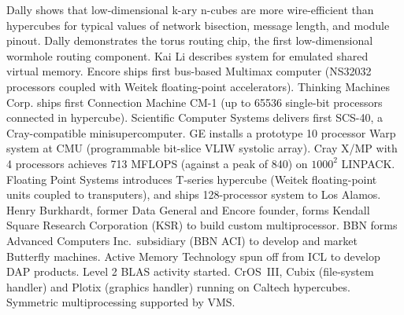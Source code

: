 	{Dally shows that low-dimensional k-ary n-cubes are more
	wire-efficient than hypercubes for typical values of network 
	bisection, message length, and module pinout.
	Dally demonstrates the torus routing chip, the first
	low-dimensional wormhole routing component.}
	{Kai Li describes system for emulated shared virtual memory.}
	{Encore ships first bus-based Multimax computer
	(NS32032 processors coupled with Weitek floating-point accelerators).}
	{Thinking Machines Corp. ships first Connection Machine CM-1
	(up to 65536 single-bit processors connected in hypercube).}
	{Scientific Computer Systems delivers first SCS-40,
	a Cray-compatible minisupercomputer.}
	{GE installs a prototype 10 processor Warp system at CMU
	(programmable bit-slice VLIW systolic array).}
	{Cray X/MP with 4 processors achieves 713 MFLOPS
	(against a peak of 840)
	on $1000^2$ LINPACK.}
	{Floating Point Systems introduces T-series hypercube
	(Weitek floating-point units coupled to transputers),
	and ships 128-processor system to Los Alamos.}
	{Henry Burkhardt, former Data General and Encore founder,	
	forms Kendall Square Research Corporation (KSR)
	to build custom multiprocessor.}
	{BBN forms Advanced Computers Inc.\ subsidiary (BBN ACI)
	to develop and market Butterfly machines.}
	{Active Memory Technology spun off from ICL to develop DAP products.}
        {Level 2 BLAS activity started.}
	{CrOS~III, Cubix (file-system handler) and Plotix (graphics handler)
	running on Caltech hypercubes.}
	{Symmetric multiprocessing supported by VMS.}

